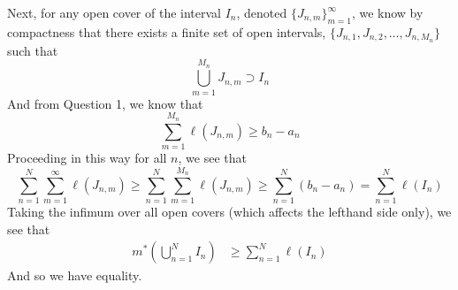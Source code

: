 \documentclass[12pt]{article}
\theoremstyle{plain}
\theoremstyle{definition}
\theoremstyle{remark}
\begin{document}
\begin{enumerate}
Next, for any open cover of the interval $I_n$, denoted $\{J_{n,m}\}_{m=1}^\infty$, we know by compactness that there exists a finite set of open intervals, $\{J_{n,1}, J_{n,2}, \ldots,J_{n,M_n}\}$ such that 
\[
    \bigcup^{M_n}_{m=1} J_{n,m} \supset I_n
\]
And from Question 1, we know that 
\begin{equation}
    \sum^{M_n}_{m=1} \ell(J_{n,m}) \geq b_n - a_n
\end{equation}
Proceeding in this way for all $n$, we see that 
\begin{equation}
    \sum^N_{n=1} 
    \sum^{\infty}_{m=1} \ell(J_{n,m}) \geq 
    \sum^N_{n=1} 
    \sum^{M_n}_{m=1} \ell(J_{n,m})
    \geq \sum^N_{n=1} (b_n - a_n)
    =\sum^N_{n=1} \ell\left(I_n\right)
\end{equation}
Taking the infimum over all open covers (which affects the lefthand side only), we see that 
\begin{align*}
    m^*\left(\bigcup^N_{n=1} I_n\right) &\geq 
    \sum^N_{n=1} \ell(I_n) 
\end{align*}
And so we have equality.






\end{enumerate}
\end{document}
